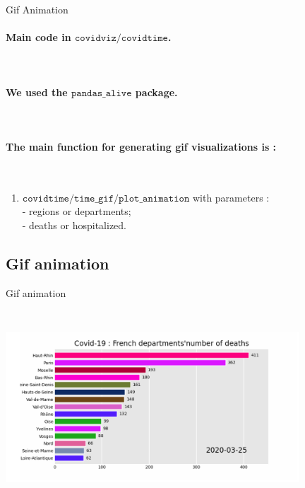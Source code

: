 \documentclass[11pt, compress, tikz, xcolor=table]{beamer}
\theoremstyle{definition}
\begin{document}
\begin{frame}[fragile]{Gif Animation} 

\paragraph{Main code in $\texttt{covidviz/covidtime}$.}\\

\paragraph{We used the $\texttt{pandas\_alive}$ package.}\\

\paragraph{The main function for generating gif visualizations is :}\\
 \begin{enumerate}
    \item $\texttt{covidtime/time\_gif/plot\_animation}$ with parameters :\\
        - regions or departments;\\
        - deaths or hospitalized.
    
\end{enumerate}

\end{frame}

\subsection{Gif animation}
\begin{frame}[fragile]{Gif animation}
             \centering
             \includegraphics[height=8cm, width=11cm]{images/Capture_gif.PNG}
\end{frame}
\end{document}
